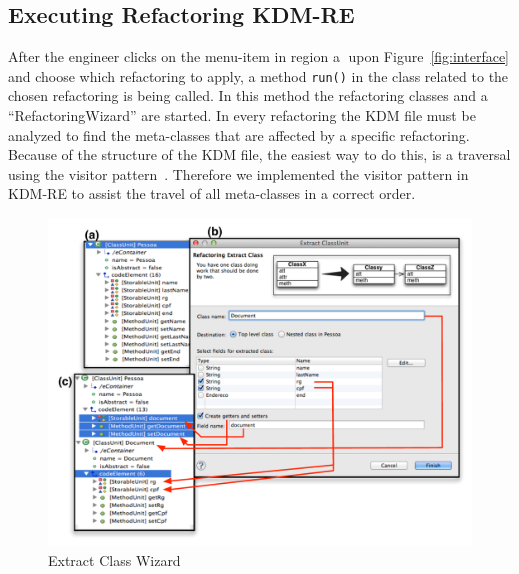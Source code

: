 \subsection{Executing Refactoring KDM-RE}

After the engineer clicks on the menu-item in region \textcircled{a} upon Figure~\ref{fig:interface} and choose which refactoring to apply, a method \texttt{run()} in the class related to the chosen refactoring is being called. In this method the refactoring classes and a ``RefactoringWizard'' are started. In every refactoring the KDM file must be analyzed to find the meta-classes that are affected by a specific refactoring. Because of the structure of the KDM file, the easiest way to do this, is a traversal using the visitor pattern~\cite{Gamma1994}. Therefore we implemented the visitor pattern in KDM-RE to assist the travel of all meta-classes in a correct order.

\begin{figure}[!ht]
\centering
  \includegraphics[scale=0.6]{figure/Wizard2}
\caption{Extract Class Wizard}
\label{fig:wizard}
\end{figure}

